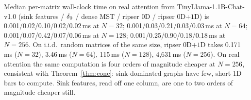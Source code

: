 Median per-matrix wall-clock time on real attention from TinyLlama-1.1B-Chat-v1.0 (sink features / $\delta_0$ / dense MST / ripser $0$D / ripser $0$D+$1$D) is 0.001/0.02/0.10/0.02/0.02\,ms at $N{=}32$; 0.001/0.03/0.21/0.03/0.03\,ms at $N{=}64$; 0.001/0.07/0.42/0.07/0.06\,ms at $N{=}128$; 0.001/0.25/0.90/0.18/0.18\,ms at $N{=}256$. On i.i.d.\ random matrices of the same size, ripser $0$D+$1$D takes 0.171\,ms ($N{=}32$), 3.46\,ms ($N{=}64$), 115\,ms ($N{=}128$), 4,631\,ms ($N{=}256$). On real attention the same computation is four orders of magnitude cheaper at $N{=}256$, consistent with Theorem~\ref{thm:cone}: sink-dominated graphs have few, short $1$D bars to compute. Sink features, read off one column, are one to two orders of magnitude cheaper still.
